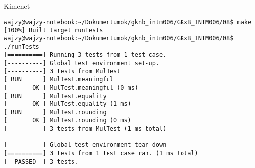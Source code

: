 \begin{frame}[fragile]
  \begin{block}{Kimenet}
    \scriptsize
    \vspace{-.5cm}
    \begin{verbatim}
wajzy@wajzy-notebook:~/Dokumentumok/gknb_intm006/GKxB_INTM006/08$ make
[100%] Built target runTests
wajzy@wajzy-notebook:~/Dokumentumok/gknb_intm006/GKxB_INTM006/08$ ./runTests 
[==========] Running 3 tests from 1 test case.
[----------] Global test environment set-up.
[----------] 3 tests from MulTest
[ RUN      ] MulTest.meaningful
[       OK ] MulTest.meaningful (0 ms)
[ RUN      ] MulTest.equality
[       OK ] MulTest.equality (1 ms)
[ RUN      ] MulTest.rounding
[       OK ] MulTest.rounding (0 ms)
[----------] 3 tests from MulTest (1 ms total)

[----------] Global test environment tear-down
[==========] 3 tests from 1 test case ran. (1 ms total)
[  PASSED  ] 3 tests.
\end{verbatim}
    \vspace{-.4cm}
  \end{block}
\end{frame}
